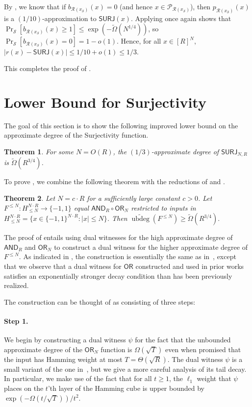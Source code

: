 \documentclass[11pt, letterpaper, fleqn]{article}
\newtheorem{theorem}{Theorem}
\theoremstyle{plain}
\renewcommand{\P}{\mathcal{P}}
\newcommand{\SURJ}{\mathsf{ SURJ}}
\newcommand{\OR}{\mathsf{ OR}}
\newcommand{\bits}{\{-1,1\}}
\newcommand{\tOmega}{\tilde{\Omega}}
\newcommand{\Rcal}{\mathcal{R}}
\newcommand{\Scal}{\mathcal{S}}
\newcommand{\ubdeg}{\widetilde{\operatorname{ubdeg}}}
\newcommand{\AND}{\mathsf{AND}}
\begin{document}
By , we know that if $b_{\Rcal(x_\Scal)}(x)=0$ (and hence $x \in \P_{\Rcal(x_\Scal)}$), then $p_{\Rcal(x_\Scal)}(x) $ is a $(1/10)$-approximation to $\SURJ(x)$. Applying  once again shows that $\Pr_{\Scal}[b_{\Rcal(x_\Scal)}(x) \ge 1] \le \exp(- \tOmega(N^{1/4}))$, so $\Pr_{\Scal}[b_{\Rcal(x_\Scal)}(x) = 0] = 1 - o(1)$. 
Hence, for all $x \in [R]^N$, $|r(x) - \SURJ(x)| \le 1/10 + o(1) \le 1/3$. 

This completes
the proof of .




\section{Lower Bound for Surjectivity}
\label{s:surjlower}
The goal of this section is to show the following improved lower bound on the approximate degree of the Surjectivity function.

\begin{theorem} \label{thm:surj}
For some $N = O(R)$, the $(1/3)$-approximate degree of $\SURJ_{N, R}$ is $\tOmega(R^{3/4})$.
\end{theorem}


To prove , we combine the following 
theorem with the reductions of  and .

\begin{theorem}   \label{thm:main-amp}
Let $N = c \cdot R$ for a sufficiently large constant $c>0$. Let $F^{\le N} \colon H^{N \cdot R}_{\le N} \to \bits$ equal $\AND_{R} \circ \OR_N$ restricted to inputs in $H^{N \cdot R}_{\le N} = \{x \in \bits^{N \cdot R} : |x| \le N\}$. Then $\ubdeg(F^{\le N}) \ge \tOmega(R^{3/4}).$
\end{theorem}

The proof of  entails using dual witnesses for the high approximate degree of $\AND_R$ and $\OR_N$ to construct a dual witness for the higher approximate degree of $F^{\le N}$. As indicated in , the construction is essentially the same as in~\cite{adegsurj}, except that we observe that a dual witness for $\OR$ constructed and used in prior works satisfies an exponentially stronger decay condition than has been previously realized. 

The construction can be thought of as consisting of three steps:
\paragraph{Step 1.} We begin by constructing a dual witness $\psi$ for the fact that the unbounded approximate degree of the $\OR_N$ function is $\Omega\left(\sqrt{T}\right)$ even when promised that the input has Hamming weight at most $T = \Theta(\sqrt{R})$. The dual witness $\psi$ is a small variant of the one in~\cite{adegsurj}, but we give a more careful analysis of its tail decay. In particular, we make use of the fact that for all $t \ge 1$, the $\ell_1$ weight that $\psi$ places on the $t$'th layer of the Hamming cube is upper bounded by $\exp(-\Omega(t/\sqrt{T})) / t^2$.
\end{document}
